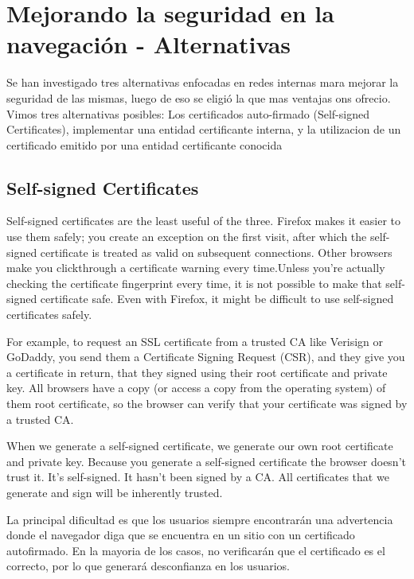 






\section{Mejorando la seguridad en la navegación - Alternativas}
Se han investigado tres alternativas enfocadas en redes internas mara mejorar la seguridad de las 
mismas, luego de eso se eligió la que mas ventajas ons ofrecio.
Vimos tres alternativas posibles: Los certificados auto-firmado (Self-signed Certificates), implementar
una entidad certificante interna, y la utilizacion de un certificado emitido por una entidad
certificante conocida

\subsection{Self-signed Certificates}
Self-signed certificates are the least useful of the three. Firefox
makes it easier to use them safely; you create an exception on the
first visit, after which the self-signed certificate is treated as valid
on subsequent connections. Other browsers make you clickthrough a certificate
 warning every time.Unless you’re
actually checking the certificate fingerprint every time, it is not
possible to make that self-signed certificate safe. Even with
Firefox, it might be difficult to use self-signed certificates safely.

For example, to request an SSL certificate from a trusted CA like Verisign or GoDaddy, you send them a 
Certificate Signing Request (CSR), and they give you a certificate in return, that they signed
 using their root certificate and private key. All browsers have a copy (or access a copy from
  the operating system) of them root certificate, so the browser can verify that your certificate
   was signed by a trusted CA.

When we generate a self-signed certificate, we generate our own root certificate and private 
key. Because you generate a self-signed certificate the browser doesn’t trust it. It’s 
self-signed. It hasn’t been signed by a CA. All certificates that we generate and sign will 
be inherently trusted.

La principal dificultad es que los usuarios siempre encontrarán una advertencia 
donde el navegador diga que se encuentra en un sitio con un certificado autofirmado. 
En la mayoria de los casos, no verificarán que el certificado es el correcto, por lo que 
generará desconfianza en los usuarios.

